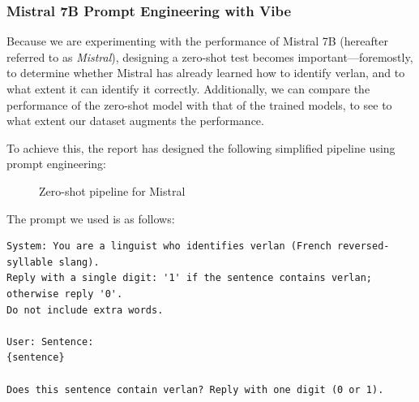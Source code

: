 \documentclass[12pt]{article}
\begin{document}
\subsubsection{Mistral 7B Prompt Engineering with Vibe}

Because we are experimenting with the performance of Mistral 7B (hereafter referred to as \textit{Mistral}), designing a zero-shot test becomes important\;---\;foremostly, to determine whether Mistral has already learned how to identify verlan, and to what extent it can identify it correctly. Additionally, we can compare the performance of the zero-shot model with that of the trained models, to see to what extent our dataset augments the performance.

To achieve this, the report has designed the following simplified pipeline using prompt engineering:

\begin{figure}[H]
    \centering
    \caption{Zero-shot pipeline for Mistral}
    \label{fig:mistral-zeroshot-pipeline}
\end{figure}

The prompt we used is as follows:

\lstset{
  basicstyle=\ttfamily\small,
  frame=single,
  xleftmargin=2em,
  xrightmargin=2em,
  breaklines=true
}

\begin{lstlisting}
System: You are a linguist who identifies verlan (French reversed-syllable slang).
Reply with a single digit: '1' if the sentence contains verlan; otherwise reply '0'.
Do not include extra words.

User: Sentence:
{sentence}

Does this sentence contain verlan? Reply with one digit (0 or 1).
\end{lstlisting}
\end{document}
